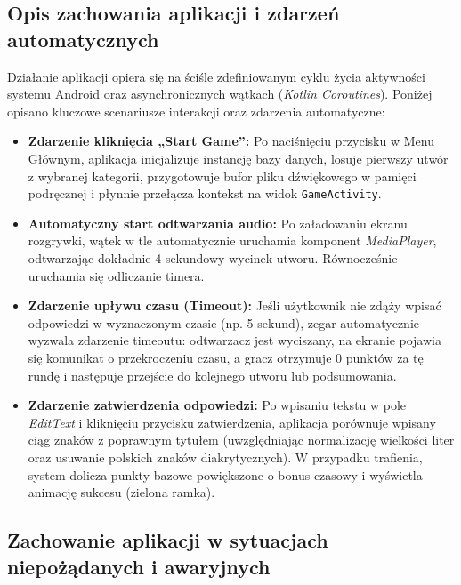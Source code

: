 
\subsection{Opis zachowania aplikacji i zdarzeń automatycznych}

\hspace{0.60cm}Działanie aplikacji opiera się na ściśle zdefiniowanym cyklu życia aktywności systemu Android oraz asynchronicznych wątkach (\textit{Kotlin Coroutines}). Poniżej opisano kluczowe scenariusze interakcji oraz zdarzenia automatyczne:

\begin{itemize}
    \item \textbf{Zdarzenie kliknięcia „Start Game”:} Po naciśnięciu przycisku w Menu Głównym, aplikacja inicjalizuje instancję bazy danych, losuje pierwszy utwór z wybranej kategorii, przygotowuje bufor pliku dźwiękowego w pamięci podręcznej i płynnie przełącza kontekst na widok \texttt{GameActivity}.
    \item \textbf{Automatyczny start odtwarzania audio:} Po załadowaniu ekranu rozgrywki, wątek w tle automatycznie uruchamia komponent \textit{MediaPlayer}, odtwarzając dokładnie 4-sekundowy wycinek utworu. Równocześnie uruchamia się odliczanie timera.
    \item \textbf{Zdarzenie upływu czasu (Timeout):} Jeśli użytkownik nie zdąży wpisać odpowiedzi w wyznaczonym czasie (np. 5 sekund), zegar automatycznie wyzwala zdarzenie timeoutu: odtwarzacz jest wyciszany, na ekranie pojawia się komunikat o przekroczeniu czasu, a gracz otrzymuje 0 punktów za tę rundę i następuje przejście do kolejnego utworu lub podsumowania.
    \item \textbf{Zdarzenie zatwierdzenia odpowiedzi:} Po wpisaniu tekstu w pole \textit{EditText} i kliknięciu przycisku zatwierdzenia, aplikacja porównuje wpisany ciąg znaków z poprawnym tytułem (uwzględniając normalizację wielkości liter oraz usuwanie polskich znaków diakrytycznych). W przypadku trafienia, system dolicza punkty bazowe powiększone o bonus czasowy i wyświetla animację sukcesu (zielona ramka).
\end{itemize}




\subsection{Zachowanie aplikacji w sytuacjach niepożądanych i awaryjnych}

